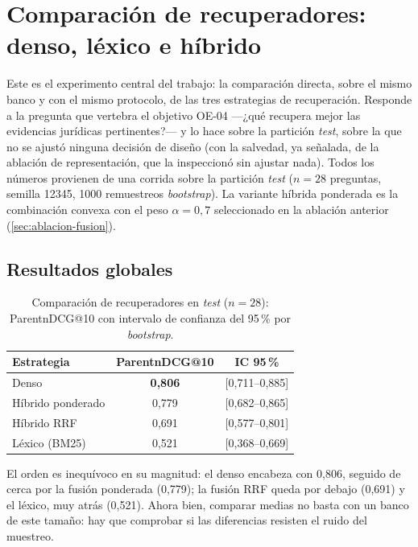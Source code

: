 \section{Comparación de recuperadores: denso, léxico e híbrido}
\label{sec:experimento-central}

Este es el experimento central del trabajo: la comparación directa, sobre el mismo banco y con el mismo protocolo, de las tres estrategias de recuperación. Responde a la pregunta que vertebra el objetivo OE-04 —¿qué recupera mejor las evidencias jurídicas pertinentes?— y lo hace sobre la partición \emph{test}, sobre la que no se ajustó ninguna decisión de diseño (con la salvedad, ya señalada, de la ablación de representación, que la inspeccionó sin ajustar nada). Todos los números provienen de una corrida sobre la partición \emph{test} ($n=28$ preguntas, semilla 12345, 1000 remuestreos \emph{bootstrap}). La variante híbrida ponderada es la combinación convexa con el peso $\alpha{=}0{,}7$ seleccionado en la ablación anterior (\ref{sec:ablacion-fusion}).

\subsection{Resultados globales}
\label{subsec:flagship-global}

\begin{table}[htbp]
    \centering
    \small
    \renewcommand{\arraystretch}{1.2}
    \caption{Comparación de recuperadores en \emph{test} ($n=28$): ParentnDCG@10 con intervalo de confianza del 95\,\% por \emph{bootstrap}.}
    \label{tab:flagship-global}
    \begin{tabular}{|l|c|c|}
        \hline
        \textbf{Estrategia} & \textbf{ParentnDCG@10} & \textbf{IC 95\,\%} \\
        \hline
        Denso                & \textbf{0,806} & [0,711--0,885] \\
        Híbrido ponderado    & 0,779          & [0,682--0,865] \\
        Híbrido RRF          & 0,691          & [0,577--0,801] \\
        Léxico (BM25)        & 0,521          & [0,368--0,669] \\
        \hline
    \end{tabular}
\end{table}

El orden es inequívoco en su magnitud: el denso encabeza con 0,806, seguido de cerca por la fusión ponderada (0,779); la fusión RRF queda por debajo (0,691) y el léxico, muy atrás (0,521). Ahora bien, comparar medias no basta con un banco de este tamaño: hay que comprobar si las diferencias resisten el ruido del muestreo.

